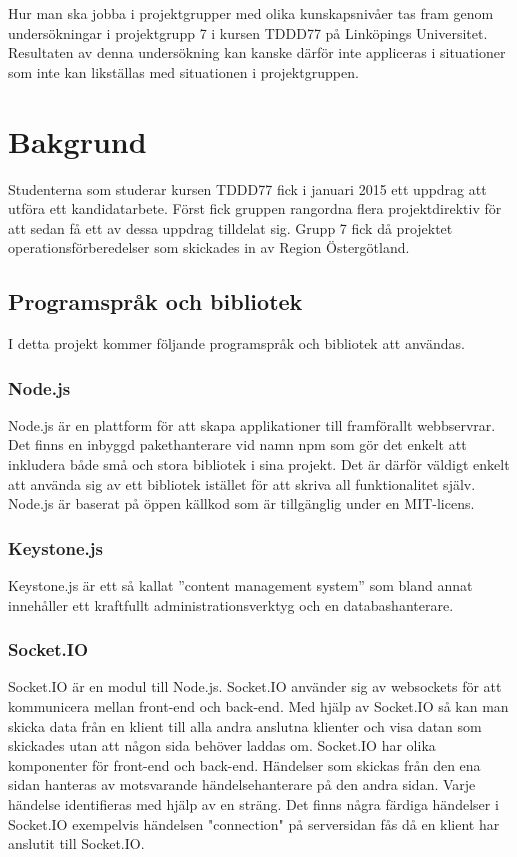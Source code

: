 \documentclass{article}
\begin{document}
Hur man ska jobba i projektgrupper med olika kunskapsnivåer tas fram genom undersökningar i projektgrupp 7 i kursen TDDD77 på Linköpings Universitet. Resultaten av denna undersökning kan kanske därför inte appliceras i situationer som inte kan likställas med situationen i projektgruppen.

\section{Bakgrund}
Studenterna som studerar kursen TDDD77 fick i januari 2015 ett uppdrag att utföra ett kandidatarbete. Först fick gruppen rangordna flera projektdirektiv för att sedan få ett av dessa uppdrag tilldelat sig. Grupp 7 fick då projektet operationsförberedelser som skickades in av Region Östergötland.

\subsection{Programspråk och bibliotek}
I detta projekt kommer följande programspråk och bibliotek att användas.

\subsubsection{Node.js}
Node.js är en plattform för att skapa applikationer till framförallt webbservrar. Det finns en inbyggd pakethanterare vid namn npm som gör det enkelt att inkludera både små och stora bibliotek i sina projekt. Det är därför väldigt enkelt att använda sig av ett bibliotek istället för att skriva all funktionalitet själv. Node.js är baserat på öppen källkod som är tillgänglig under en MIT-licens.

\subsubsection{Keystone.js}
Keystone.js är ett så kallat ''content management system'' som bland annat innehåller ett kraftfullt administrationsverktyg och en databashanterare.

\subsubsection{Socket.IO}
Socket.IO är en modul till Node.js. Socket.IO använder sig av websockets för att kommunicera mellan front-end och back-end. Med hjälp av Socket.IO så kan man skicka data från en klient till alla andra anslutna klienter och visa datan som skickades utan att någon sida behöver laddas om.
Socket.IO har olika komponenter för front-end och back-end. Händelser som skickas från den ena sidan hanteras av motsvarande händelsehanterare på den andra sidan. Varje händelse identifieras med hjälp av en sträng. Det finns några färdiga händelser i Socket.IO exempelvis händelsen "connection" på serversidan fås då en klient har anslutit till Socket.IO.
\end{document}
